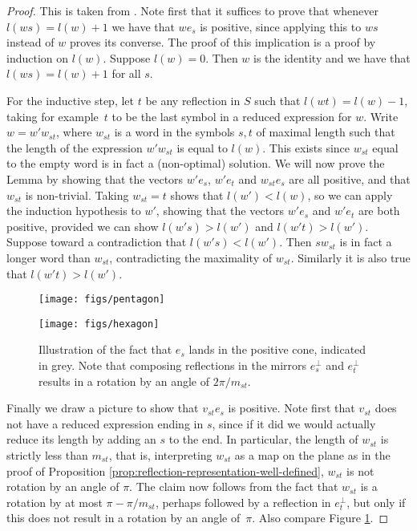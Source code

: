 \documentclass[main.tex]{subfiles}
\begin{document}
\begin{proof}
This is taken from \cite{humphreys1990}. Note first that it 
suffices to prove that whenever $l(ws) = l(w) + 1$ we have that 
$we_s$ is positive, since applying this to $ws$ instead of $w$ 
proves its converse. 
The proof of this implication is a proof by induction on $l(w)$. 
Suppose $l(w) = 0$. Then $w$ is the identity and we have that 
$l(ws) = l(w) + 1$ for all $s$. 

For the inductive step, let $t$ be any reflection in $S$ such 
that $l(wt) = l(w) - 1$, taking for example~$t$ to be the last 
symbol in a reduced expression for $w$. Write $w = w'w_{st}$, 
where $w_{st}$ is a word in the symbols $s, t$ of maximal length 
such that the length of the expression $w'w_{st}$ is equal to 
$l(w)$. This exists since $w_{st}$ equal to the empty word is in 
fact a (non-optimal) solution.
We will now prove the Lemma by showing that the vectors $w'e_s$, 
$w'e_t$ and $w_{st}e_s$ are all positive, and that $w_{st}$ is 
non-trivial. Taking $w_{st} = t$ shows that $l(w') < l(w)$, so 
we can apply the induction hypothesis to $w'$, showing that the 
vectors $w'e_s$ and $w'e_t$ are both positive, provided we can 
show $l(w's) > l(w')$ and $l(w't) > l(w')$. 
Suppose toward a contradiction that $l(w's) < l(w')$. Then 
$sw_{st}$ is in fact a longer word than $w_{st}$, contradicting the
maximality of $w_{st}$. Similarly it is also true that 
$l(w't) > l(w')$.

\begin{figure}[ht]
	\centering
	\begin{minipage}{.5\textwidth}
		\centering		
		\texttt{[image: figs/pentagon]}
	\end{minipage}%
	\begin{minipage}{.5\textwidth}
		\centering
		\texttt{[image: figs/hexagon]}
	\end{minipage}
	\caption{Illustration of the fact that $e_s$ lands in 
	the positive cone, indicated in grey. Note that composing
	reflections in the mirrors $e_s^\perp$ and $e_t^\perp$
	results in a rotation by an angle of $2\pi/m_{st}$.}
	\label{fig:humphreys-5.4-proof}
\end{figure}

Finally we draw a picture to show that $v_{st}e_s$ is positive.
Note first that $v_{st}$ does not have a reduced expression 
ending in $s$, since if it did we would actually reduce its 
length by adding an $s$ to the end. In particular, the length of 
$w_{st}$ is strictly less than $m_{st}$, that is, interpreting 
$w_{st}$ as a map on the plane as in the proof of Proposition 
\ref{prop:reflection-representation-well-defined}, $w_{st}$ is 
not rotation by an angle of $\pi$. The claim now follows from 
the fact that $w_{st}$ is a rotation by at most $\pi - \pi/m_{st}$, 
perhaps followed by a reflection in $e_t^\perp$, but only if 
this does not result in a rotation by an angle of~$\pi$. Also 
compare Figure \ref{fig:humphreys-5.4-proof}.
\end{proof}
\end{document}
